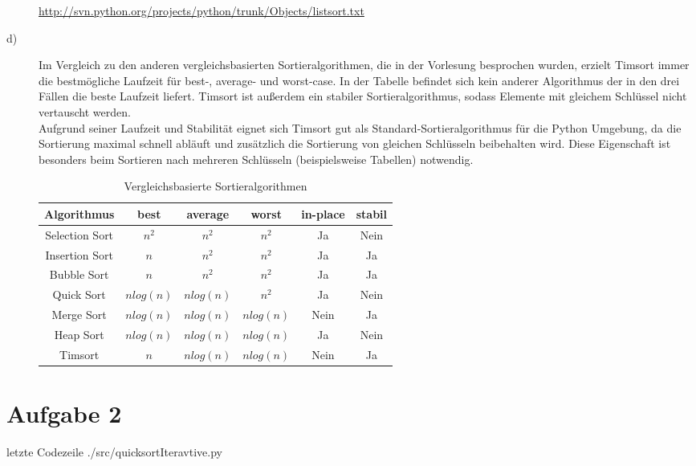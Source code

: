 \begin{description}
\url{http://svn.python.org/projects/python/trunk/Objects/listsort.txt}
\item[d)]
Im Vergleich zu den anderen vergleichsbasierten Sortieralgorithmen, die in der Vorlesung besprochen wurden, erzielt Timsort immer die bestmögliche Laufzeit für best-, average- und worst-case. In der Tabelle befindet sich kein anderer Algorithmus der in den drei Fällen die beste Laufzeit liefert. Timsort ist außerdem ein stabiler Sortieralgorithmus, sodass Elemente mit gleichem Schlüssel nicht vertauscht werden. \\
Aufgrund seiner Laufzeit und Stabilität eignet sich Timsort gut als Standard-Sortieralgorithmus für die Python Umgebung, da die Sortierung maximal schnell abläuft und zusätzlich die Sortierung von gleichen Schlüsseln beibehalten wird. Diese Eigenschaft ist besonders beim Sortieren nach mehreren Schlüsseln (beispielsweise Tabellen) notwendig.
\begin{table}[H]
\centering
\begin{tabular}{|c|c|c|c|c|c|}
\hline
Algorithmus & best & average & worst & in-place & stabil \\ \hline
Selection Sort & $n^2$ & $n^2$ & $n^2$ & Ja & Nein \\ \hline
Insertion Sort & $n$ &$ n^2$ &$ n^2$ & Ja & Ja \\ \hline
Bubble Sort & $n$ & $n^2$ & $n^2$ & Ja & Ja \\ \hline
Quick Sort & $n log(n)$ & $n log(n)$ & $n^2$ & Ja & Nein \\ \hline
Merge Sort & $n log(n)$ & $n log(n)$ & $n log(n)$ & Nein & Ja \\ \hline
Heap Sort & $n log(n)$ & $n log(n)$ & $n log(n)$ & Ja & Nein \\ \hline
Timsort & $n$ & $n log(n)$ & $n log(n)$ & Nein & Ja \\ \hline
\end{tabular}
\caption{Vergleichsbasierte Sortieralgorithmen}
\end{table}
\end{description}

\section{Aufgabe 2}
 letzte Codezeile
{./src/quicksortIteravtive.py}




